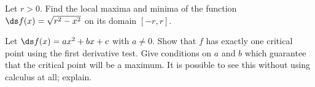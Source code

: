 \begin{enumialphparenastyle}
\begin{ex}
 Let $r>0$. Find the local
maxima and minima of the function $\ds f(x)
=\sqrt{r^2 -x^2 }$ on its domain $[-r,r]$.
\end{ex}

\begin{ex}
 Let $\ds f(x) =a x^2 + bx + c$ with $a\neq 0$. Show that $f$
has exactly one critical point using the first derivative test. Give
conditions on $a$ and $b$ which guarantee that the critical point will
be a maximum. It is possible to see this without using calculus at
all; explain.
\end{ex}

\end{enumialphparenastyle}